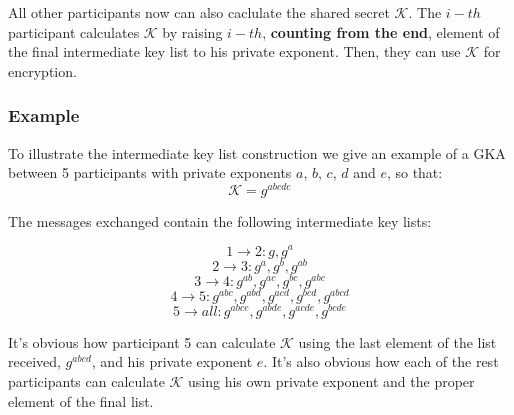 All other participants now can also caclulate the shared secret $\mathcal{K}$. The $i-th$ participant calculates $\mathcal{K}$ by raising $i-th$, {\bf counting from the end}, element of the final intermediate key list to his private exponent. Then, they can use $\mathcal{K}$ for encryption.

\subsubsection{Example}
To illustrate the intermediate key list construction we give an example of a GKA between 5 participants with private exponents $a$, $b$, $c$, $d$ and $e$, so that:
\[
\mathcal{K} = g^{abcde}
\]

The messages exchanged contain the following intermediate key lists:

\[ 1 \rightarrow 2: g, g^a \]
\[ 2 \rightarrow 3: g^a, g^b, g^{ab} \]
\[ 3 \rightarrow 4: g^{ab}, g^{ac}, g^{bc}, g^{abc} \]
\[ 4 \rightarrow 5: g^{abc}, g^{abd}, g^{acd}, g^{bcd}, g^{abcd} \]
\[ 5 \rightarrow all: g^{abce}, g^{abde}, g^{acde}, g^{bcde} \]

It's obvious how participant 5 can calculate $\mathcal{K}$ using the last element of the list received, $g^{abcd}$, and his private exponent $e$. It's also obvious how each of the rest participants can calculate $\mathcal{K}$ using his own private exponent and the proper element of the final list.



